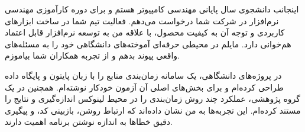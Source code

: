 اینجانب دانشجوی سال پایانی مهندسی کامپیوتر هستم و برای دوره کارآموزی مهندسی نرم‌افزار در شرکت شما درخواست می‌دهم. فعالیت تیم شما در ساخت ابزارهای کاربردی و توجه آن به کیفیت محصول، با علاقه من به توسعه نرم‌افزار قابل اعتماد هم‌خوانی دارد. مایلم در محیطی حرفه‌ای آموخته‌های دانشگاهی خود را به مسئله‌های واقعی پیوند بدهم و از تجربه همکاران شما بیاموزم.

در پروژه‌های دانشگاهی، یک سامانه زمان‌بندی منابع را با زبان پایتون و پایگاه داده طراحی کرده‌ام و برای بخش‌های اصلی آن آزمون خودکار نوشته‌ام. همچنین در یک گروه پژوهشی، عملکرد چند روش زمان‌بندی را در محیط لینوکس اندازه‌گیری و نتایج را مستند کرده‌ام. این تجربه‌ها به من نشان داده‌اند که ارتباط روشن، بازبینی کد، و پیگیری دقیق خطاها به اندازه نوشتن برنامه اهمیت دارند.
